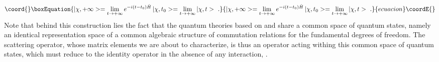 \documentclass[a4paper,11pt]{article}
\begin{document}
\begin{equation}\coord{}\boxEquation{
|\chi,+\infty>=
\lim_{t\rightarrow +\infty}e^{-i(t-t_0)\hat{H}}\,|\chi,t_0>=
\lim_{t\rightarrow +\infty}|\chi,t>\ .
}{
|\chi,+\infty>=
\lim_{t\rightarrow +\infty}e^{-i(t-t_0)\hat{H}}\,|\chi,t_0>=
\lim_{t\rightarrow +\infty}|\chi,t>\ .
}{ecuacion}\coordE{}\end{equation}
Note that behind this construction lies the fact that the quantum theories
based on \coordHE{} and \coordHE{} share a common space of quantum states,
namely an identical representation space of a common algebraic structure
of commutation relations for the fundamental degrees of freedom. The scattering
operator, whose matrix elements we are about to characterize, is thus an
operator acting withing this common space of quantum states, which must 
reduce to the identity operator in the absence of any interaction, 
\coordHE{}.
\end{document}
